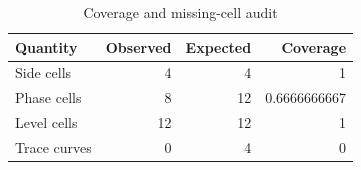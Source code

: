 \begin{table}[htbp]
\centering
\caption{Coverage and missing-cell audit}
\small
\begin{tabular}{@{}lrrr@{}}
\toprule
Quantity & Observed & Expected & Coverage \\
\midrule
Side cells & 4 & 4 & 1 \\
Phase cells & 8 & 12 & 0.6666666667 \\
Level cells & 12 & 12 & 1 \\
Trace curves & 0 & 4 & 0 \\
\bottomrule
\end{tabular}
\end{table}
